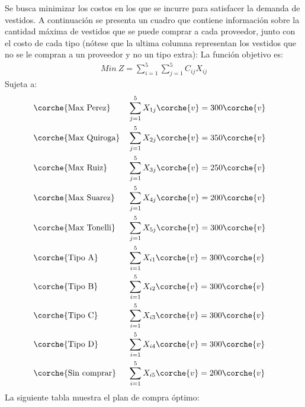 \begin{homeworkProblem}[-1][Vestidos]
Se busca minimizar los costos en los que se incurre para satisfacer la demanda de vestidos. A continuación se presenta un cuadro que contiene información sobre la cantidad máxima de vestidos que se puede comprar a cada proveedor, junto con el costo de cada tipo (nótese que la ultima columna representan los vestidos que no se le compran a un proveedor y no un tipo extra):
La función objetivo es:
\begin{align*}
    Min\ Z = \sum_{i=1}^{5}{\sum_{j=1}^{5}{C_{ij}X_{ij}}}
\end{align*}
Sujeta a:
\begin{align*}
    &\corche{\text{Max Perez}}& &\sum_{j=1}^{5}{X_{1j}}\corche{v} = 300\corche{v}& \\
    &\corche{\text{Max Quiroga}}& &\sum_{j=1}^{5}{X_{2j}}\corche{v} = 350\corche{v}& \\
    &\corche{\text{Max Ruiz}}& &\sum_{j=1}^{5}{X_{3j}}\corche{v} = 250\corche{v}& \\
    &\corche{\text{Max Suarez}}& &\sum_{j=1}^{5}{X_{4j}}\corche{v} = 200\corche{v}& \\
    &\corche{\text{Max Tonelli}}& &\sum_{j=1}^{5}{X_{5j}}\corche{v} = 300\corche{v}& \\
    &\corche{\text{Tipo A}}& &\sum_{i=1}^{5}{X_{i1}}\corche{v} = 300\corche{v}& \\
    &\corche{\text{Tipo B}}& &\sum_{i=1}^{5}{X_{i2}}\corche{v} = 300\corche{v}& \\
    &\corche{\text{Tipo C}}& &\sum_{i=1}^{5}{X_{i3}}\corche{v} = 300\corche{v}& \\
    &\corche{\text{Tipo D}}& &\sum_{i=1}^{5}{X_{i4}}\corche{v} = 300\corche{v}& \\
    &\corche{\text{Sin comprar}}& &\sum_{i=1}^{5}{X_{i5}}\corche{v} = 200\corche{v}& \\
\end{align*}
La siguiente tabla muestra el plan de compra óptimo:
\end{homeworkProblem}


